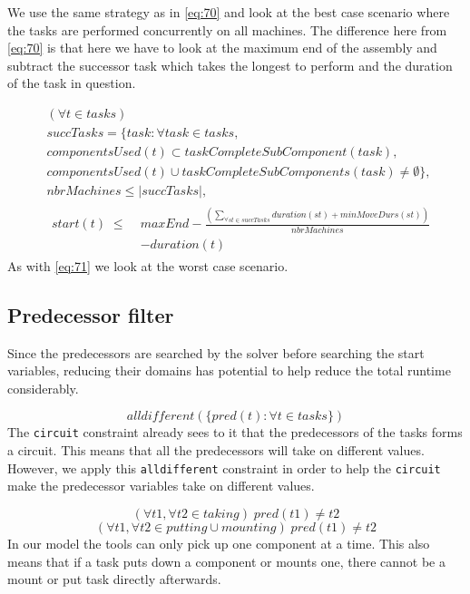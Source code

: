   We use the same strategy as in \ref{eq:70} and look at the best case scenario where the tasks are performed concurrently on all machines. The difference here from \ref{eq:70} is that here we have to look at the maximum end of the assembly and subtract the successor task which takes the longest to perform and the duration of the task in question.
  
  \begin{equation}\label{eq:73}
  \begin{aligned}
  &(\forall t \in tasks)\\
  &succTasks = \{task : \forall task \in tasks, \\
  &componentsUsed(t) \subset taskCompleteSubComponent(task), \\
  &componentsUsed(t) \cup taskCompleteSubComponents(task) \neq \emptyset\}, \\
  &nbrMachines \le |succTasks|, \\
  &\begin{aligned}
  start(t) \; \le \; &maxEnd - \frac{\left(\sum_{\forall st \in succTasks}duration(st) + minMoveDurs(st)\right)}{nbrMachines}\\
  &- duration(t)
  \end{aligned}
  \end{aligned}
  \end{equation}
  As with \ref{eq:71} we look at the worst case scenario.
  
  
  \subsection{Predecessor filter}
  Since the predecessors are searched by the solver before searching the start variables, reducing their domains has potential to help reduce the total runtime considerably.
  
  \begin{equation}\label{eq:74}
  alldifferent(\{pred(t) : \forall t \in tasks\})
  \end{equation}
 The \texttt{circuit} constraint already sees to it that the predecessors of the tasks forms a circuit. This means that all the predecessors will take on different values. However, we apply this \texttt{alldifferent} constraint in order to help the \texttt{circuit} make the predecessor variables take on different values.
  
  \begin{equation}\label{eq:75}
  (\forall t1, \forall t2 \in taking) \; pred(t1) \neq t2
  \end{equation}
  \begin{equation}\label{eq:76}
  (\forall t1, \forall t2 \in putting \cup mounting) \; pred(t1) \neq t2
  \end{equation}
 In our model the tools can only pick up one component at a time. This also means that if a task puts down a component or mounts one, there cannot be a mount or put task directly afterwards.
  
